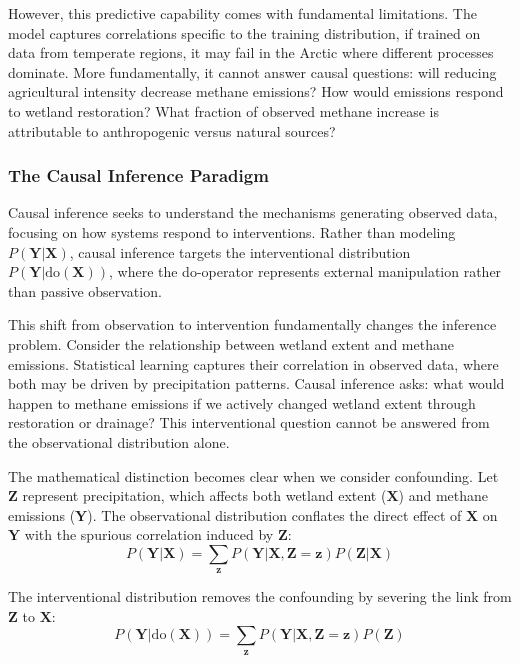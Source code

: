 However, this predictive capability comes with fundamental limitations. The model captures correlations specific to the training distribution, if trained on data from temperate regions, it may fail in the Arctic where different processes dominate. More fundamentally, it cannot answer causal questions: will reducing agricultural intensity decrease methane emissions? How would emissions respond to wetland restoration? What fraction of observed methane increase is attributable to anthropogenic versus natural sources?

\subsubsection{The Causal Inference Paradigm}

Causal inference seeks to understand the mechanisms generating observed data, focusing on how systems respond to interventions. Rather than modeling $P(\mathbf{Y}|\mathbf{X})$, causal inference targets the interventional distribution $P(\mathbf{Y}|\text{do}(\mathbf{X}))$, where the do-operator represents external manipulation rather than passive observation.

This shift from observation to intervention fundamentally changes the inference problem. Consider the relationship between wetland extent and methane emissions. Statistical learning captures their correlation in observed data, where both may be driven by precipitation patterns. Causal inference asks: what would happen to methane emissions if we actively changed wetland extent through restoration or drainage? This interventional question cannot be answered from the observational distribution alone.

The mathematical distinction becomes clear when we consider confounding. Let $\mathbf{Z}$ represent precipitation, which affects both wetland extent ($\mathbf{X}$) and methane emissions ($\mathbf{Y}$). The observational distribution conflates the direct effect of $\mathbf{X}$ on $\mathbf{Y}$ with the spurious correlation induced by $\mathbf{Z}$:
\begin{equation}
	P(\mathbf{Y}|\mathbf{X}) = \sum_{\mathbf{z}} P(\mathbf{Y}|\mathbf{X},\mathbf{Z}=\mathbf{z})P(\mathbf{Z}|\mathbf{X})
\end{equation}

The interventional distribution removes the confounding by severing the link from $\mathbf{Z}$ to $\mathbf{X}$:
\begin{equation}
	P(\mathbf{Y}|\text{do}(\mathbf{X})) = \sum_{\mathbf{z}} P(\mathbf{Y}|\mathbf{X},\mathbf{Z}=\mathbf{z})P(\mathbf{Z})
\end{equation}

